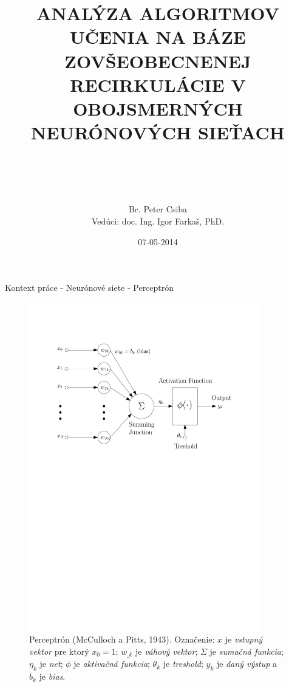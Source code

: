 \documentclass[xcolor=dvipsnames]{beamer}
\title[ANALÝZA ALGORITMOV UČENIA V OBOJSMERNÝCH NEURÓNOVÝCH SIEŤACH]{
ANALÝZA ALGORITMOV UČENIA NA BÁZE ZOVŠEOBECNENEJ RECIRKULÁCIE V OBOJSMERNÝCH NEURÓNOVÝCH SIEŤACH\\
\\
\\
}
\author[P. Csiba]{Bc. Peter Csiba \\ Vedúci: doc. Ing. Igor Farkaš, PhD.}
\institute[FMFI UK]{
  UNIVERZITA KOMENSKÉHO V BRATISLAVE\\
  FAKULTA MATEMATIKY, FYZIKY A INFORMATIKY
}
\date{07-05-2014}
\begin{document}
\begin{frame}[plain]
  \titlepage
\end{frame}



\begin{frame}{Kontext práce - Neurónové siete - Perceptrón}
  \begin{figure}[h]
    \centering
    \includegraphics[width=0.9\textwidth]{img/perceptron.pdf}    
    \caption{Perceptrón (McCulloch a Pitts, 1943). Označenie: $x$ je \emph{vstupný vektor} pre ktorý $x_0=1$; $w_{\_k}$ je \emph{váhový vektor}; $\Sigma$ je \emph{sumačná funkcia}; $\eta_k$ je \emph{net}; $\phi$ je \emph{aktivačná funkcia}; $\theta_k$ je \emph{treshold}; $y_k$ je \emph{daný výstup} a $b_k$ je \emph{bias}.} 
    \label{fig:perceptron}
  \end{figure} 

\end{frame}
\end{document}
